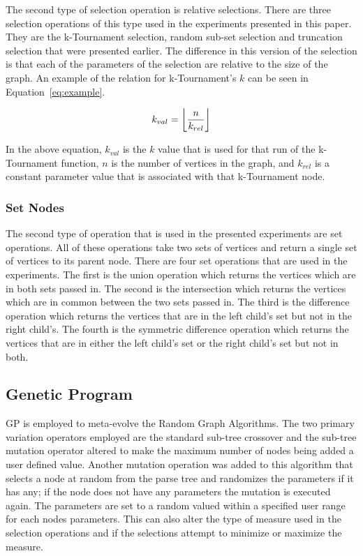 \documentclass{article}
\DeclarePairedDelimiter\floor{\lfloor}{\rfloor}
\begin{document}
The second type of selection operation is relative selections. There are three selection operations of this type used in the experiments presented
in this paper. They are the k-Tournament selection, random sub-set selection and truncation selection that were presented earlier. The difference
in this version of the selection is that each of the parameters of the selection are relative to the size of the graph. An example of the
relation for k-Tournament's $k$ can be seen in Equation~\ref{eq:example}.

\begin{equation}
\label{eq:example}
k_{val} = \floor*{\frac{n}{k_{rel}}}
\end{equation}

In the above equation, $k_{val}$ is the $k$ value that is used for that run of the k-Tournament function, $n$ is the number of vertices in the graph, and $k_{rel}$
is a constant parameter value that is associated with that k-Tournament node.


\subsubsection{Set Nodes}

The second type of operation that is used in the presented experiments are set operations. All of these operations take two sets of vertices and return
a single set of vertices to its parent node. There are four set operations that are used in the experiments. The first is the union operation which returns
the vertices which are in both sets passed in. The second is the intersection which returns the vertices which are in common between the two sets passed in. 
The third is the difference operation which returns the vertices that are in the left child's set but not in the right child's. The fourth is the symmetric
difference operation which returns the vertices that are in either the left child's set or the right child's set but not in both. 


\subsection{Genetic Program}
GP is employed to meta-evolve the Random Graph Algorithms. The two primary variation operators employed are the standard sub-tree crossover and the sub-tree
mutation operator altered to make the maximum number of nodes being added a user defined value. Another mutation operation was added to this algorithm that 
selects a node at random from the parse tree and randomizes the parameters if it has any; if the node does not have any parameters the mutation is executed again. 
The parameters are set to a random valued within a specified user range for each nodes parameters. This can also alter the type of measure used in the selection
operations and if the selections attempt to minimize or maximize the measure. 
\end{document}
